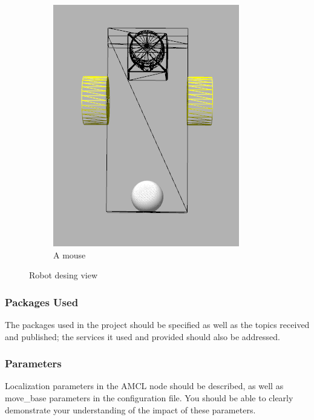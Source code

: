 \documentclass[10pt,journal,compsoc]{IEEEtran}
\begin{document}
\begin{figure}
\begin{subfigure}[b]{0.3\textwidth}
        \includegraphics[width=\textwidth]{robokoko-design-3}
        \caption{A mouse}
        \label{fig:mouse}
    \end{subfigure}
    \caption{Robot desing view}\label{fig:animals}
\end{figure}


\subsubsection{Packages Used}
The packages used in the project should be specified as well as the topics received and published; the services it used and provided should also be addressed. 

\subsubsection{Parameters}
Localization parameters in the AMCL node should be described, as well as move\_base parameters in the configuration file. You should be able to clearly demonstrate your understanding of the impact of these parameters.
\end{document}
